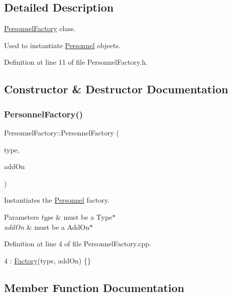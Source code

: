 \subsection{Detailed Description}
\hyperlink{classPersonnelFactory}{Personnel\+Factory} class. 

Used to instantiate \hyperlink{classPersonnel}{Personnel} objects. 

Definition at line 11 of file Personnel\+Factory.\+h.



\subsection{Constructor \& Destructor Documentation}
\mbox{\label{classPersonnelFactory_a71cd406976230cacebfcfd723d2a2615}} 
\subsubsection{\texorpdfstring{Personnel\+Factory()}{PersonnelFactory()}}
{\footnotesize\ttfamily Personnel\+Factory\+::\+Personnel\+Factory (\begin{DoxyParamCaption}\item[{\hyperlink{classType}{Type} $\ast$}]{type,  }\item[{\hyperlink{classAddOn}{Add\+On} $\ast$}]{add\+On }\end{DoxyParamCaption})}



Instantiates the \hyperlink{classPersonnel}{Personnel} factory. 


\begin{DoxyParams}{Parameters}
{\em type} & must be a Type$\ast$ \\
\hline
{\em add\+On} & must be a Add\+On$\ast$ \\
\hline
\end{DoxyParams}


Definition at line 4 of file Personnel\+Factory.\+cpp.


\begin{DoxyCode}
4 : \hyperlink{classFactory_aca946f8877efb5b5bae700f74537d99d}{Factory}(type, addOn) \{\}
\end{DoxyCode}


\subsection{Member Function Documentation}
\mbox{\label{classPersonnelFactory_ad60e8371e52153294112b16a7a97cc2d}} 
